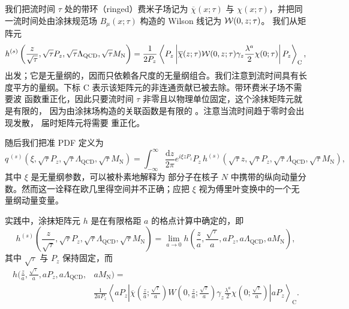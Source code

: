 我们把流时间 $\tau$ 处的带环（ringed）费米子场记为
$\overline{\chi}(x;\tau)$ 与 $\chi(x;\tau)$，并把同一流时间处由涂抹规范场
$B_\mu(x;\tau)$ 构造的 Wilson 线记为 ${\bf\cal W}(0,z;\tau)$。
我们从矩阵元
\begin{equation}\label{eq:hdef}
h^{(s)}\left(\frac{z}{\sqrt{\tau}},\sqrt{\tau}P_z,
\sqrt{\tau}\Lambda_{\mathrm{QCD}},\sqrt{\tau}M_\mathrm{N}\right) =
\frac{1}{2P_z}\left\langle
P_z \left| \overline{\chi}(z;\tau)
{\bf\cal W}(0,z;\tau)\gamma_z\frac{\lambda^a}{2}\chi(0;\tau)\right|
P_z\right\rangle_\mathrm{C},
\end{equation}
出发；它是无量纲的，因而只依赖各尺度的无量纲组合。我们注意到流时间具有长度平方的量纲。下标 C
表示该矩阵元的非连通贡献已被去除。带环费米子场不需要波
函数重正化，因此只要流时间 $\tau$ 非零且以物理单位固定，这个涂抹矩阵元就是有限的，
因为由涂抹场构造的关联函数是有限的
\cite{Luscher:2011bx,Luscher:2013cpa}。注意当流时间趋于零时会出现发散，
届时矩阵元将需要
重正化。

随后我们把准 PDF
\cite{Ji:2013dva,Ji:2014gla} 定义为
\begin{equation}\label{eq:qpdfdef}
q^{\,(s)}\left(\xi,\sqrt{\tau}P_z,\sqrt{\tau}\Lambda_{\mathrm{QCD}},
\sqrt{\tau}M_\mathrm{N}\right)
=
\int_{-\infty}^\infty \frac{\mathrm{d}z}{2\pi} e^{i\xi z
P_z} P_z\,
h^{(s)}(\sqrt{\tau}z,\sqrt{\tau}P_z,\sqrt{\tau}\Lambda_{\mathrm{QCD}},
\sqrt{\tau}M_\mathrm{N}),
\end{equation}
其中 $\xi$ 是无量纲参数，可以被朴素地解释为
部分子在核子 $N$ 中携带的纵向动量分数。然而这一诠释在欧几里得空间并不正确；应把 $\xi$
视为傅里叶变换中的一个无量纲动量变量。

实践中，涂抹矩阵元 $h$ 是在有限格距 $a$ 的格点计算中确定的，即
\begin{equation}\label{eq:hacont}
h^{(s)}\left(\frac{z}{\sqrt{\tau}},\sqrt{\tau}P_z,\sqrt{\tau}\Lambda_{\mathrm{QCD}},
\sqrt{\tau}
M_\mathrm{N}\right) =  \lim_{a\to 0}
h\left(\frac{z}{a},\frac{\sqrt{\tau}}{a},aP_z,a\Lambda_{\mathrm{QCD}},aM_\mathrm{N}
\right) ,
\end{equation}
其中 $\sqrt{\tau}$ 与 $P_z$ 保持固定，而
\begin{align}
h\Big(\frac{z}{a},\frac{\sqrt{\tau}}{a},aP_z,a\Lambda_{\mathrm{QCD}},{} &
aM_\mathrm{N}\Big) = \nonumber\\
{} & \frac{1}{2aP_z}
\left\langle
aP_z \left|
\overline{\chi}\left(\frac{z}{a};\frac{\sqrt{\tau}}{a}\right)
W\left(0,\frac{z}{a};\frac{\sqrt{\tau}}{a}\right)\gamma_z\frac{\lambda^a}{2}
\chi\left(0;\frac{\sqrt{\tau}}{a}\right)\right|
aP_z\right\rangle_\mathrm{C}.
\end{align}
